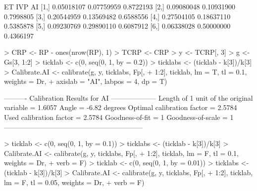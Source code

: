 \documentclass[a4paper]{article}
\begin{document}
\begin{Schunk}
\begin{Soutput}
             ET        IVP        AI
[1,] 0.05018107 0.07759959 0.8722193
[2,] 0.09080048 0.10931900 0.7998805
[3,] 0.20544959 0.13569482 0.6588556
[4,] 0.27504105 0.18637110 0.5385878
[5,] 0.09230769 0.29890110 0.6087912
[6,] 0.06338028 0.50000000 0.4366197
\end{Soutput}
\begin{Sinput}
> CRP <- RP - ones(nrow(RP), 1) %
> TCRP <- CRP %
> y <- TCRP[, 3]
> g <- Gs[3, 1:2]
> ticklab <- c(0, seq(0, 1, by = 0.2))
> ticklabs <- (ticklab - k[3])/k[3]
> Calibrate.AI <- calibrate(g, y, ticklabs, Fp[, 
+     1:2], ticklab, lm = T, tl = 0.1, weights = Dr, 
+     axislab = "AI", labpos = 4, dp = T)
\end{Sinput}
\begin{Soutput}
---------- Calibration Results for  AI  --------------------
Length of 1 unit of the original variable =  1.6057  
Angle                                     =  -6.82 degrees
Optimal calibration factor                =  2.5784  
Used calibration factor                   =  2.5784  
Goodness-of-fit                           =  1  
Goodness-of-scale                         =  1  
------------------------------------------------------------
\end{Soutput}
\begin{Sinput}
> ticklab <- c(0, seq(0, 1, by = 0.1))
> ticklabs <- (ticklab - k[3])/k[3]
> Calibrate.AI <- calibrate(g, y, ticklabs, Fp[, 
+     1:2], ticklab, lm = F, tl = 0.1, weights = Dr, 
+     verb = F)
> ticklab <- c(0, seq(0, 1, by = 0.01))
> ticklabs <- (ticklab - k[3])/k[3]
> Calibrate.AI <- calibrate(g, y, ticklabs, Fp[, 
+     1:2], ticklab, lm = F, tl = 0.05, weights = Dr, 
+     verb = F)
\end{Sinput}
\end{Schunk}
\end{document}
